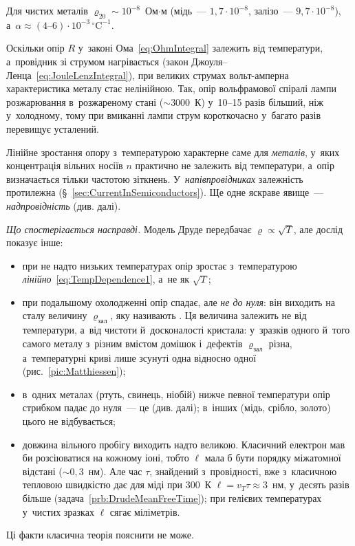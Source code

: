 Для чистих металів $\varrho_{20}\sim10^{-8}$~Ом$\cdot$м (мідь~--- $1{,}7\cdot10^{-8}$,
залізо~--- $9{,}7\cdot10^{-8}$),
а~$\alpha\approx(4\text{--}6)\cdot10^{-3}\,{}^\circ\text{C}^{-1}$.

Оскільки опір $R$ у~законі Ома~\eqref{eq:OhmIntegral} залежить від температури,
а~провідник зі струмом нагрівається (закон Джоуля--Ленца~\eqref{eq:JouleLenzIntegral}), при
великих струмах вольт-амперна характеристика металу стає нелінійною. Так, опір
вольфрамової спіралі лампи розжарювання в~розжареному стані ($\sim3000$~К) у~10--15 разів
більший, ніж у~холодному, тому при вмиканні лампи струм короткочасно у~багато разів
перевищує усталений.

\begin{Attention}[unbreakable]
	Лінійне зростання опору з~температурою характерне саме для \emph{металів}, у~яких
	концентрація вільних носіїв $n$ практично не залежить від температури, а~опір
	визначається тільки частотою зіткнень. У~\emph{напівпровідниках} залежність
	протилежна (\S~\ref{sec:CurrentInSemiconductors}). Ще одне яскраве явище~---
	\emph{надпровідність} (див. далі).
\end{Attention}

\emph{Що спостерігається насправді.} Модель Друде передбачає $\varrho\propto\sqrt T$, але
дослід показує інше:
\begin{itemize}
	\item при не надто низьких температурах опір зростає з~температурою
	  \emph{лінійно}~\eqref{eq:TempDependence1}, а~не як $\sqrt T$;
	\item при подальшому охолодженні опір спадає, але \emph{не до нуля}: він виходить на
	  сталу величину $\varrho_{\text{зал}}$, яку називають . Ця
	  величина залежить не від температури, а~від чистоти й~досконалості кристала:
	  у~зразків одного й~того самого металу з~різним вмістом домішок і~дефектів
	  $\varrho_{\text{зал}}$ різна, а~температурні криві лише зсунуті одна відносно одної
	  (рис.~\ref{pic:Matthiessen});
	\item в~одних металах (ртуть, свинець, ніобій) нижче певної температури опір стрибком
	  падає до нуля~--- це  (див. далі); в~інших (мідь, срібло,
	  золото) цього не відбувається;
	\item довжина вільного пробігу виходить надто великою. Класичний електрон мав би
	  розсіюватися на кожному іоні, тобто $\ell$ мала б бути порядку міжатомної відстані
	  ($\sim0{,}3$~нм). Але час $\tau$, знайдений з~провідності, вже з~класичною тепловою
	  швидкістю дає для міді при $300$~К $\ell = v_T\tau\approx3$~нм, у~десять разів більше
	  (задача~\ref{prb:DrudeMeanFreeTime}); при гелієвих температурах у~чистих зразках
	  $\ell$ сягає міліметрів.
\end{itemize}
Ці факти класична теорія пояснити не може.


